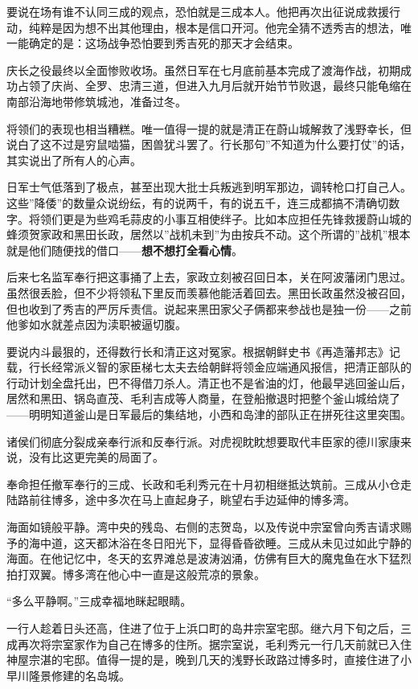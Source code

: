 \documentclass[
]{article}
\begin{document}
要说在场有谁不认同三成的观点，恐怕就是三成本人。他把再次出征说成救援行动，纯粹是因为想不出其他理由，根本是信口开河。他完全猜不透秀吉的想法，唯一能确定的是：这场战争恐怕要到秀吉死的那天才会结束。

庆长之役最终以全面惨败收场。虽然日军在七月底前基本完成了渡海作战，初期成功占领了庆尚、全罗、忠清三道，但进入九月后就开始节节败退，最终只能龟缩在南部沿海地带修筑城池，准备过冬。

将领们的表现也相当糟糕。唯一值得一提的就是清正在蔚山城解救了浅野幸长，但说白了这不过是穷鼠啮猫，困兽犹斗罢了。行长那句''不知道为什么要打仗''的话，其实说出了所有人的心声。

日军士气低落到了极点，甚至出现大批士兵叛逃到明军那边，调转枪口打自己人。这些''降倭''的数量众说纷纭，有的说两千，有的说五千，连三成都搞不清确切数字。将领们更是为些鸡毛蒜皮的小事互相使绊子。比如本应担任先锋救援蔚山城的蜂须贺家政和黑田长政，居然以''战机未到''为由按兵不动。这个所谓的''战机''根本就是他们随便找的借口------\textbf{想不想打全看心情}。

后来七名监军奉行把这事捅了上去，家政立刻被召回日本，关在阿波藩闭门思过。虽然很丢脸，但不少将领私下里反而羡慕他能活着回去。黑田长政虽然没被召回，但也收到了秀吉的严厉斥责信。说起来黑田家父子俩都来参战也是独一份------之前他爹如水就差点因为渎职被逼切腹。

要说内斗最狠的，还得数行长和清正这对冤家。根据朝鲜史书《再造藩邦志》记载，行长经常派义智的家臣梯七太夫去给朝鲜将领金应端通风报信，把清正部队的行动计划全盘托出，巴不得借刀杀人。清正也不是省油的灯，他最早逃回釜山后，居然和黑田、锅岛直茂、毛利吉成等人商量，在登船撤退时把整个釜山城给烧了------明明知道釜山是日军最后的集结地，小西和岛津的部队正在拼死往这里突围。

诸侯们彻底分裂成亲奉行派和反奉行派。对虎视眈眈想要取代丰臣家的德川家康来说，没有比这更完美的局面了。

奉命担任撤军奉行的三成、长政和毛利秀元在十月初相继抵达筑前。三成从小仓走陆路前往博多，途中多次在马上直起身子，眺望右手边延伸的博多湾。

海面如镜般平静。湾中央的残岛、右侧的志贺岛，以及传说中宗室曾向秀吉请求赐予的海中道，这天都沐浴在冬日阳光下，显得昏昏欲睡。三成从未见过如此宁静的海面。在他记忆中，冬天的玄界滩总是波涛汹涌，仿佛有巨大的魔鬼鱼在水下猛烈拍打双翼。博多湾在他心中一直是这般荒凉的景象。

``多么平静啊。''三成幸福地眯起眼睛。

一行人趁着日头还高，住进了位于上浜口町的岛井宗室宅邸。继六月下旬之后，三成再次将宗室家作为自己在博多的住所。据宗室说，毛利秀元一行几天前就已入住神屋宗湛的宅邸。值得一提的是，晚到几天的浅野长政路过博多时，直接住进了小早川隆景修建的名岛城。
\end{document}
